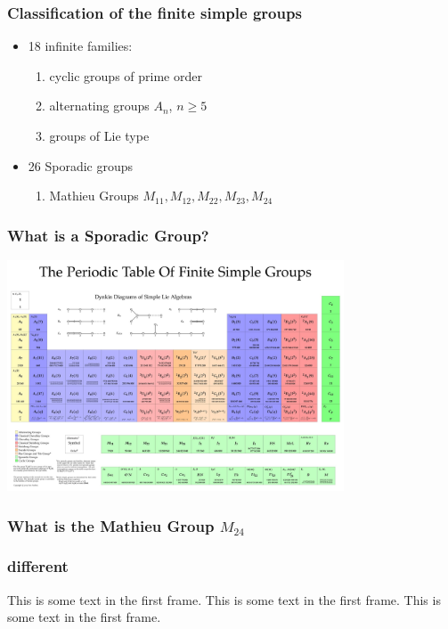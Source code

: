 \documentclass{beamer}
\begin{document}
\begin{frame}
    \frametitle{Classification of the finite simple groups} 
    \begin{itemize}
        \item<2-> 18 infinite families:
            \begin{enumerate}
                \item<3-> cyclic groups of prime order
                \item<3-> alternating groups \( A_n \), \( n \ge 5 \) 
                \item<4->[3-18.] groups of Lie type
            \end{enumerate}

        \item<5-> 26 Sporadic groups
            \begin{enumerate}
                \item<6-> Mathieu Groups \( M_{11}, M_{12}, M_{22}, M_{23}, M_{24} \)
            \end{enumerate}
    \end{itemize} 
\end{frame}

\begin{frame}
    \frametitle{What is a Sporadic Group?} 
    \includegraphics[width=10cm]{periodic}
\end{frame}

\begin{frame}
    \frametitle{What is the Mathieu Group \( M_{24} \)}
\end{frame}



\begin{frame}
    \frametitle{different}
    This is some text in the first frame. This is some text in the first frame. This is some text in the first frame.
\end{frame}
\end{document}
